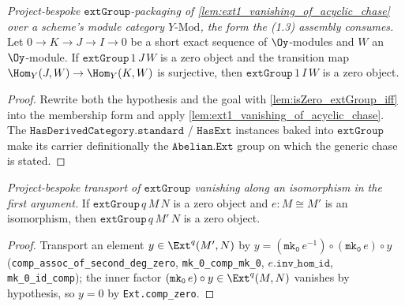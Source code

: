 \begin{lemma}

  \label{lem:ext1_isZero_of_acyclic_chase}
  \textit{Project-bespoke $\mathtt{extGroup}$-packaging of
  \cref{lem:ext1_vanishing_of_acyclic_chase} over a scheme's module category
  $Y\text{-Mod}$, the form the (1.3) assembly consumes.}
  Let $0 \to K \to J \to I \to 0$ be a short exact sequence of $\Oy$-modules and
  $W$ an $\Oy$-module. If $\mathtt{extGroup}\,1\,J\,W$ is a zero object and the
  transition map $\Hom_Y(J, W) \to \Hom_Y(K, W)$ is surjective, then
  $\mathtt{extGroup}\,1\,I\,W$ is a zero object.
  \begin{proof}
    Rewrite both the hypothesis and the goal with \cref{lem:isZero_extGroup_iff}
    into the membership form and apply \cref{lem:ext1_vanishing_of_acyclic_chase}.
    The $\mathtt{HasDerivedCategory.standard}$ / $\mathtt{HasExt}$ instances baked
    into $\mathtt{extGroup}$ make its carrier definitionally the $\mathtt{Abelian.Ext}$
    group on which the generic chase is stated.
  \end{proof}
\end{lemma}

\begin{lemma}

  \label{lem:isZero_extGroup_of_iso_left}
  \textit{Project-bespoke transport of $\mathtt{extGroup}$ vanishing along an
  isomorphism in the first argument.}
  If $\mathtt{extGroup}\,q\,M\,N$ is a zero object and $e : M \cong M'$ is an
  isomorphism, then $\mathtt{extGroup}\,q\,M'\,N$ is a zero object.
  \begin{proof}
    Transport an element $y \in \Ext^q(M', N)$ by
    $y = (\mathtt{mk_0}\,e^{-1}) \circ (\mathtt{mk_0}\,e) \circ y$
    (\texttt{comp\_assoc\_of\_second\_deg\_zero}, \texttt{mk\_0\_comp\_mk\_0},
    $e.\mathtt{inv\_hom\_id}$, \texttt{mk\_0\_id\_comp}); the inner factor
    $(\mathtt{mk_0}\,e) \circ y \in \Ext^q(M, N)$ vanishes by hypothesis, so
    $y = 0$ by \texttt{Ext.comp\_zero}.
  \end{proof}
\end{lemma}

